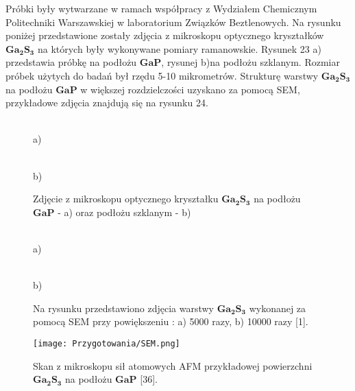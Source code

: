 Próbki były wytwarzane w ramach współpracy z Wydziałem Chemicznym Politechniki Warszawskiej w laboratorium Związków Beztlenowych. Na rysunku poniżej przedstawione zostały zdjęcia z mikroskopu optycznego kryształków $\mathbf{Ga_2S_3}$ na których były wykonywane pomiary ramanowskie. Rysunek 23 a) przedstawia próbkę na podłożu $\mathbf{GaP}$, rysunej b)na podłożu szklanym. Rozmiar próbek użytych do badań był rzędu 5-10 mikrometrów. Strukturę warstwy $\mathbf{Ga_{2}S_{3}}$ na podłożu $\mathbf{GaP}$ w większej rozdzielczości uzyskano za pomocą SEM, przykładowe zdjęcia znajdują się na rysunku 24.

\begin{figure}[H]
	\begin{minipage}[h]{0.5\linewidth}
		 \\ a) 
	\end{minipage}
	\hfill
	\begin{minipage}[h]{0.5\linewidth}
		 \\b)
	\end{minipage}
	\caption{Zdjęcie z mikroskopu optycznego kryształku $\mathbf{Ga_{2}S_{3}}$ na podłożu $\mathbf{GaP}$ - a) oraz podłożu szklanym - b)}
\end{figure}

\begin{figure}[H]
	\begin{minipage}[h]{0.47\linewidth}
		 \\a) 
	\end{minipage}
	\hfill
	\begin{minipage}[h]{0.47\linewidth}
		 \\b)
	\end{minipage}
	\caption{Na rysunku przedstawiono zdjęcia warstwy $\mathbf{Ga_{2}S_{3}}$ wykonanej za pomocą SEM przy powiększeniu : a) 5000 razy, b) 10000 razy [1].}
\end{figure}

\begin{figure}[H]
	\begin{center}
		\texttt{[image: Przygotowania/SEM.png]}
		\caption{Skan z mikroskopu sił atomowych AFM przykładowej powierzchni $\mathbf{Ga_2S_3}$ na podłożu $\mathbf{GaP}$ [36].}
	\end{center}
\end{figure}

